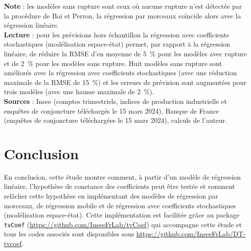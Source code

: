 \documentclass[
  a4paper,
  DIV=11,
  numbers=noendperiod,
  french]{scrartcl}
\newcommand\1{{\mathds 1}}
\theoremstyle{remark}
\begin{document}
{\footnotesize\raggedright

\textbf{Note} : les modèles sans rupture sont ceux où aucune rupture
n'est détectée par la procédure de Bai et Perron, la régression par
morceaux coïncide alors avec la régression linéaire.\\
\textbf{Lecture} : pour les prévisions hors échantillon la régression
avec coefficients stochastiques (modélisation espace-état) permet, par
rapport à la régression linéaire, de réduire la RMSE d'en moyenne de
5~\% pour les modèles avec rupture et de 2~\% pour les modèles sans
rupture. Huit modèles sans rupture sont améliorés avec la régression
avec coefficients stochastiques (avec une réduction maximale de la RMSE
de 15~\%) et les erreurs de prévision sont augmentées pour trois modèles
(avec une hausse maximale de 2~\%).\\
\textbf{Sources} : Insee (comptes trimestriels, indices de production
industrielle et enquêtes de conjoncture téléchargés le 15 mars 2024),
Banque de France (enquêtes de conjoncture téléchargées le 15 mars 2024),
calculs de l'auteur.

}

\section{Conclusion}\label{conclusion}

En conclusion, cette étude montre comment, à partir d'un modèle de
régression linéaire, l'hypothèse de constance des coefficients peut être
testée et comment relâcher cette hypothèse en implémentant des modèles
de régression par morceaux, de régression mobile et de régression avec
coefficients stochastiques (modélisation espace-état). Cette
implémentation est facilitée grâce au package \texttt{tvCoef}
(\url{https://github.com/InseeFrLab/tvCoef}) qui accompagne cette étude
et tous les codes associés sont disponibles sous
\url{https://github.com/InseeFrLab/DT-tvcoef}.
\end{document}
